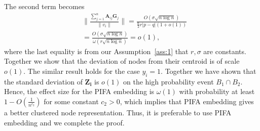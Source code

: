 \documentclass{article} %
\begin{document}
The second term becomes
\begin{align}
	&  \| \frac{\sum_{j=1}^n\mathbf{A}_{ij}\mathbf{G}_j}{\|v_i\|} \| = \frac{O(\sigma\sqrt{n\log n})}{\frac{n}{2}r|p-q|(1+o(1))}\\
	& = \frac{O(\sigma\sqrt{n\log n})}{\omega(r\sqrt{n\log n})} = o(1),
\end{align}
where the last equality is from our Assumption~\ref{ass:1} that $r,\sigma$ are constants. Together we show that the deviation of nodes from their centroid is of scale $o(1)$. The similar result holds for the case $y_i=1$. Together we have shown that the standard deviation of $\mathbf{Z_i}$ is $o(1)$ on the high probability event $B_1\cap B_2$. Hence, the effect size for the PIFA embedding is $\omega(1)$ with probability at least $1-O(\frac{1}{n^{c_2}})$ for some constant $c_2>0$, which implies that PIFA embedding gives a better clustered node representation. Thus, it is preferable to use PIFA embedding and we complete the proof.
\end{document}
